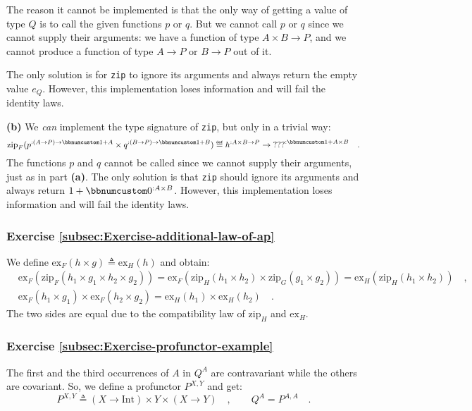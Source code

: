 The reason it cannot be implemented is that the only way of getting
a value of type $Q$ is to call the given functions $p$ or $q$.
But we cannot call $p$ or $q$ since we cannot supply their arguments:
we have a function of type $A\times B\rightarrow P$, and we cannot
produce a function of type $A\rightarrow P$ or $B\rightarrow P$
out of it.

The only solution is for \lstinline!zip! to ignore its arguments
and always return the empty value $e_{Q}$. However, this implementation
loses information and will fail the identity laws.

\textbf{(b)} We \emph{can} implement the type signature of \lstinline!zip!,
but only in a trivial way:
\[
\text{zip}_{F}(p^{:(A\rightarrow P)\rightarrow\bbnum 1+A}\times q^{:(B\rightarrow P)\rightarrow\bbnum 1+B})\triangleq h^{:A\times B\rightarrow P}\rightarrow\text{???}^{:\bbnum 1+A\times B}\quad.
\]
The functions $p$ and $q$ cannot be called since we cannot supply
their arguments, just as in part \textbf{(a)}. The only solution is
that \lstinline!zip! should ignore its arguments and always return
$1+\bbnum 0^{:A\times B}$. However, this implementation loses information
and will fail the identity laws.

\subsubsection*{Exercise \ref{subsec:Exercise-additional-law-of-ap}}

We define $\text{ex}_{F}(h\times g)\triangleq\text{ex}_{H}(h)$ and
obtain:
\begin{align*}
 & \text{ex}_{F}(\text{zip}_{F}(h_{1}\times g_{1}\times h_{2}\times g_{2}))=\text{ex}_{F}(\text{zip}_{H}(h_{1}\times h_{2})\times\text{zip}_{G}(g_{1}\times g_{2}))=\text{ex}_{H}(\text{zip}_{H}(h_{1}\times h_{2}))\quad,\\
 & \text{ex}_{F}(h_{1}\times g_{1})\times\text{ex}_{F}(h_{2}\times g_{2})=\text{ex}_{H}(h_{1})\times\text{ex}_{H}(h_{2})\quad.
\end{align*}
The two sides are equal due to the compatibility law of $\text{zip}_{H}$
and $\text{ex}_{H}$.

\subsubsection*{Exercise \ref{subsec:Exercise-profunctor-example}}

The first and the third occurrences of $A$ in $Q^{A}$ are contravariant
while the others are covariant. So, we define a profunctor $P^{X,Y}$
and get:
\[
P^{X,Y}\triangleq\left(X\rightarrow\text{Int}\right)\times Y\times\left(X\rightarrow Y\right)\quad,\quad\quad Q^{A}=P^{A,A}\quad.
\]


